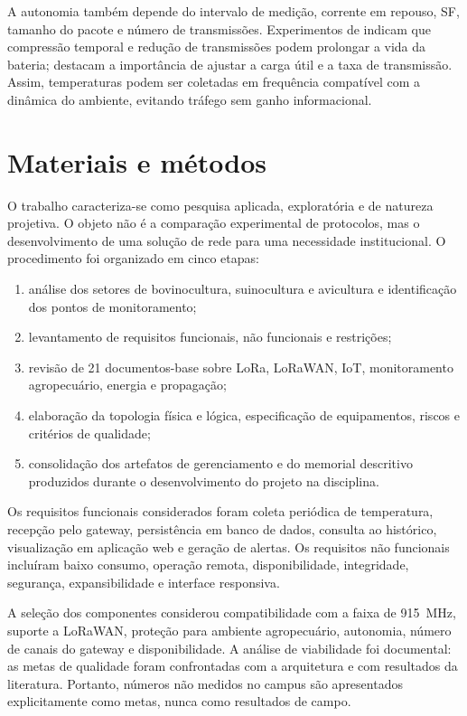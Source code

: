 \documentclass[10pt,a4paper,twocolumn]{article}
\begin{document}
A autonomia também depende do intervalo de medição, corrente em repouso, SF,
tamanho do pacote e número de transmissões. Experimentos de
 indicam que compressão temporal e redução de
transmissões podem prolongar a vida da bateria; 
destacam a importância de ajustar a carga útil e a taxa de transmissão. Assim,
temperaturas podem ser coletadas em frequência compatível com a dinâmica do
ambiente, evitando tráfego sem ganho informacional.

\section{Materiais e métodos}

O trabalho caracteriza-se como pesquisa aplicada, exploratória e de natureza
projetiva. O objeto não é a comparação experimental de protocolos, mas o
desenvolvimento de uma solução de rede para uma necessidade institucional. O
procedimento foi organizado em cinco etapas:

\begin{enumerate}
  \item análise dos setores de bovinocultura, suinocultura e avicultura e
  identificação dos pontos de monitoramento;
  \item levantamento de requisitos funcionais, não funcionais e restrições;
  \item revisão de 21 documentos-base sobre LoRa, LoRaWAN, IoT, monitoramento
  agropecuário, energia e propagação;
  \item elaboração da topologia física e lógica, especificação de equipamentos,
  riscos e critérios de qualidade;
  \item consolidação dos artefatos de gerenciamento e do memorial descritivo
  produzidos durante o desenvolvimento do projeto na disciplina.
\end{enumerate}

Os requisitos funcionais considerados foram coleta periódica de temperatura,
recepção pelo gateway, persistência em banco de dados, consulta ao histórico,
visualização em aplicação web e geração de alertas. Os requisitos não funcionais
incluíram baixo consumo, operação remota, disponibilidade, integridade,
segurança, expansibilidade e interface responsiva.

A seleção dos componentes considerou compatibilidade com a faixa de
\SI{915}{\mega\hertz}, suporte a LoRaWAN, proteção para ambiente agropecuário,
autonomia, número de canais do gateway e disponibilidade. A análise de
viabilidade foi documental: as metas de qualidade foram confrontadas com a
arquitetura e com resultados da literatura. Portanto, números não medidos no
campus são apresentados explicitamente como metas, nunca como resultados de
campo.
\end{document}
